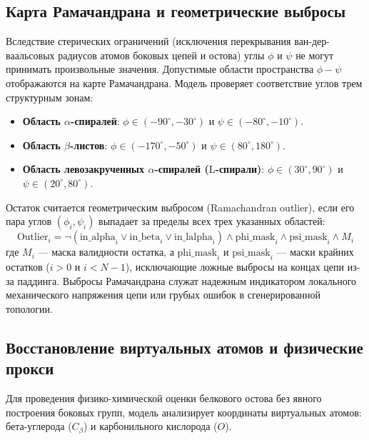\documentclass[12pt, a4paper]{article}
\begin{document}
\subsection{Карта Рамачандрана и геометрические выбросы}
Вследствие стерических ограничений (исключения перекрывания ван-дер-ва\-аль\-со\-вых радиусов атомов боковых цепей и остова) углы $\phi$ и $\psi$ не могут принимать произвольные значения. Допустимые области пространства $\phi-\psi$ отображаются на карте Рамачандрана. Модель проверяет соответствие углов трем структурным зонам:
\begin{itemize}
    \item \textbf{Область $\alpha$-спиралей}: $\phi \in (-90^\circ, -30^\circ)$ и $\psi \in (-80^\circ, -10^\circ)$.
    \item \textbf{Область $\beta$-листов}: $\phi \in (-170^\circ, -50^\circ)$ и $\psi \in (80^\circ, 180^\circ)$.
    \item \textbf{Область левозакрученных $\alpha$-спиралей ($\mathrm{L}$-спирали)}: $\phi \in (30^\circ, 90^\circ)$ и $\psi \in (20^\circ, 80^\circ)$.
\end{itemize}

Остаток считается геометрическим выбросом (Ramachandran outlier), если его пара углов $(\phi_i, \psi_i)$ выпадает за пределы всех трех указанных областей:
\begin{equation}
    \text{Outlier}_i = \neg \left( \text{in\_alpha}_i \lor \text{in\_beta}_i \lor \text{in\_lalpha}_i \right) \land \text{phi\_mask}_i \land \text{psi\_mask}_i \land M_i
\end{equation}
где $M_i$ — маска валидности остатка, а $\text{phi\_mask}_i$ и $\text{psi\_mask}_i$ — маски крайних остатков ($i > 0$ и $i < N-1$), исключающие ложные выбросы на концах цепи из-за паддинга. Выбросы Рамачандрана служат надежным индикатором локального механического напряжения цепи или грубых ошибок в сгенерированной топологии.

\subsection{Восстановление виртуальных атомов и физические прокси}
Для проведения физико-химической оценки белкового остова без явного построения боковых групп, модель анализирует координаты виртуальных атомов: бета-углерода ($C_\beta$) и карбонильного кислорода ($O$).
\end{document}
